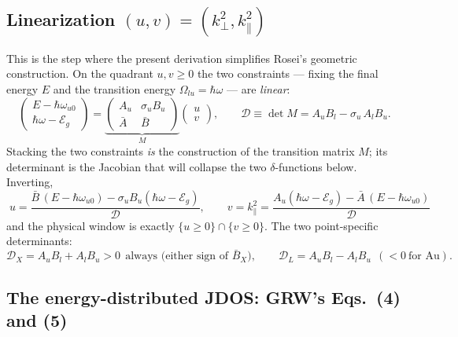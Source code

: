 \documentclass[11pt,a4paper]{article}
\numberwithin{equation}{section}
\newcommand{\hw}{\hbar\omega}
\newcommand{\Eg}{\mathcal{E}_g}
\newcommand{\cD}{\mathcal{D}}
\newcommand{\Ab}{\bar{A}}
\newcommand{\Bb}{\bar{B}}
\newcommand{\kperp}{k_{\perp}}
\newcommand{\kpar}{k_{\parallel}}
\newcommand{\wuz}{\hbar\omega_{u0}}
\begin{document}
\subsection{Linearization $(u,v)=(\kperp^2,\kpar^2)$}\label{sec:linear}

This is the step where the present derivation simplifies Rosei's
geometric construction.  On the quadrant $u,v\ge0$ the two constraints
--- fixing the final energy $E$ and the transition energy
$\Omega_{lu}=\hw$ --- are \emph{linear}:
\begin{equation}
\begin{pmatrix} E-\wuz\\[2pt] \hw-\Eg\end{pmatrix}
=\underbrace{\begin{pmatrix} A_u & \sigma_uB_u\\[2pt] \Ab & \Bb\end{pmatrix}}_{\textstyle M}
\begin{pmatrix} u\\[2pt] v\end{pmatrix},
\qquad
\cD\equiv\det M=A_uB_l-\sigma_u\,A_lB_u .
\label{eq:linsys}
\end{equation}
Stacking the two constraints \emph{is} the construction of the
transition matrix $M$; its determinant is the Jacobian that will
collapse the two $\delta$-functions below.  Inverting,
\begin{equation}
\boxed{\;
u=\frac{\Bb\,(E-\wuz)-\sigma_uB_u(\hw-\Eg)}{\cD},
\qquad
v=\kpar^{2}=\frac{A_u(\hw-\Eg)-\Ab\,(E-\wuz)}{\cD}
\;}
\label{eq:uv}
\end{equation}
and the physical window is exactly $\{u\ge0\}\cap\{v\ge0\}$.
The two point-specific determinants:
\begin{equation}
\cD_X=A_uB_l+A_lB_u>0\ \ \text{always (either sign of $\Bb_X$)},
\qquad
\cD_L=A_uB_l-A_lB_u\ \ (<0\ \text{for Au}) .
\label{eq:Ds}
\end{equation}

\subsection{The energy-distributed JDOS: GRW's Eqs.\ (4) and (5)}
\label{sec:kernel}
\end{document}
